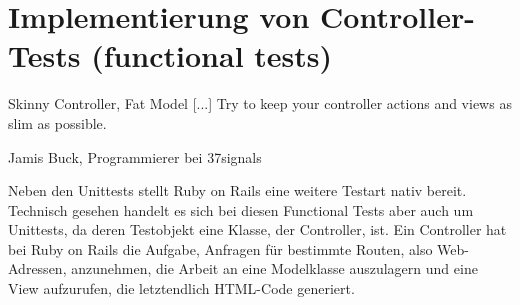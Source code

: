 \section{Implementierung von Controller-Tests (functional tests)}
\epigraph{Skinny Controller, Fat Model [...] Try to keep your controller actions and views as slim as possible.}{Jamis Buck, Programmierer bei 37signals}


Neben den Unittests stellt Ruby on Rails eine weitere Testart nativ bereit. Technisch gesehen handelt es sich bei diesen Functional Tests aber auch um Unittests, da deren Testobjekt eine Klasse, der Controller, ist. 
Ein Controller hat bei Ruby on Rails die Aufgabe, Anfragen für bestimmte Routen, also Web-Adressen, anzunehmen, die Arbeit an eine Modelklasse auszulagern und eine View aufzurufen, die letztendlich HTML-Code generiert.

